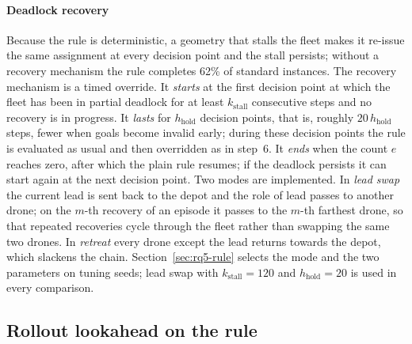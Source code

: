 \documentclass[final,5p,times,twocolumn]{elsarticle}
\begin{document}
\paragraph{Deadlock recovery}
Because the rule is deterministic, a geometry that stalls the fleet makes it re-issue the same
assignment at every decision point and the stall persists; without a recovery mechanism the rule
completes 62\% of standard instances. The recovery mechanism is a timed override. It \emph{starts}
at the first decision point at which the fleet has been in partial deadlock for at least
$k_{\mathrm{stall}}$ consecutive steps and no recovery is in progress. It \emph{lasts} for
$h_{\mathrm{hold}}$ decision points, that is, roughly $20\,h_{\mathrm{hold}}$ steps, fewer when
goals become invalid early; during these decision points the rule is evaluated as usual and then
overridden as in step~6. It \emph{ends} when the count $e$ reaches zero, after which the plain
rule resumes; if the deadlock persists it can start again at the next decision point. Two modes
are implemented. In \emph{lead swap} the current lead is sent back to the depot and the role of
lead passes to another drone; on the $m$-th recovery of an episode it passes to the $m$-th farthest
drone, so that repeated recoveries cycle through the fleet rather than swapping the same two drones.
In \emph{retreat} every drone except the lead returns towards the depot, which slackens the
chain. Section~\ref{sec:rq5-rule} selects the mode and the two parameters on tuning seeds;
lead swap with $k_{\mathrm{stall}} = 120$ and $h_{\mathrm{hold}} = 20$ is used in every comparison.

\subsection{Rollout lookahead on the rule}
\label{sec:lookahead}
\end{document}
